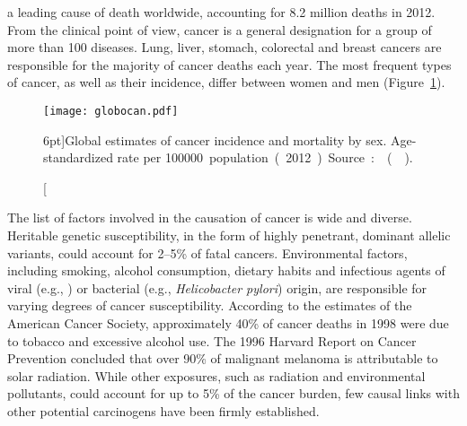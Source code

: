 \medskip


 a leading cause of death worldwide, accounting
for 8.2 million deaths in 2012.  From the clinical point of view, cancer is a
general designation for a group of more than 100 diseases.  Lung, liver,
stomach, colorectal and breast cancers are responsible for the majority of
cancer deaths each year.  The most frequent types of cancer, as well as their
incidence, differ between women and men (Figure~\ref{fig:globocan}).

\begin{figure}[ht]
  \texttt{[image: globocan.pdf]}
  \caption[Global estimates of cancer incidence and mortality by
  sex][6pt]{Global estimates of cancer incidence and mortality by sex.
    \mbox{Age-standardized} rate per \SI{100000} population (2012).  Source:
    \mbox{} (\citealp{ferlay_globocan_2014}).}
  \label{fig:globocan}
\end{figure}

The list of factors involved in the causation of cancer is wide and diverse.
Heritable genetic susceptibility, in the form of highly penetrant, dominant
allelic variants, could account for 2--5\% of fatal cancers.  Environmental
factors, including smoking, alcohol consumption, dietary habits and infectious
agents of viral (e.g., ) or bacterial (e.g., \emph{Helicobacter
  pylori}) origin, are responsible for varying degrees of cancer
susceptibility.\cite{cassidy_oxford_2010} According to the estimates of the
American Cancer Society, approximately 40\% of cancer deaths in 1998 were due to
tobacco and excessive alcohol use.  The 1996 Harvard Report on Cancer Prevention
concluded that over 90\% of malignant melanoma is attributable to solar
radiation.  While other exposures, such as radiation and environmental
pollutants, could account for up to 5\% of the cancer burden, few causal links
with other potential carcinogens have been firmly established.

